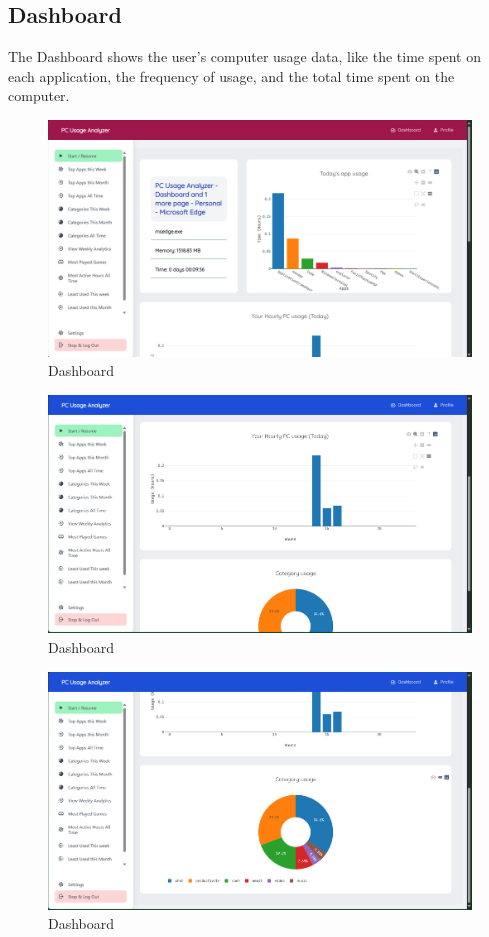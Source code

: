 \documentclass[openany]{report}
\begin{document}
\subsection{Dashboard}
The Dashboard shows the user's computer usage data, like the time spent on each application, the frequency of usage, and the total time spent on the computer.\\
\begin{figure}[H]
    \centering
    \includegraphics[width=.95\textwidth]{screenshots/dashboard.png}
    \caption{Dashboard}
\end{figure}
\begin{figure}[H]
    \centering
    \includegraphics[width=.95\textwidth]{screenshots/dashboard 2.png}
    \caption{Dashboard}
\end{figure}
\begin{figure}[H]
    \centering
    \includegraphics[width=.95\textwidth]{screenshots/dashboard 3.png}
    \caption{Dashboard}
\end{figure}
\end{document}
